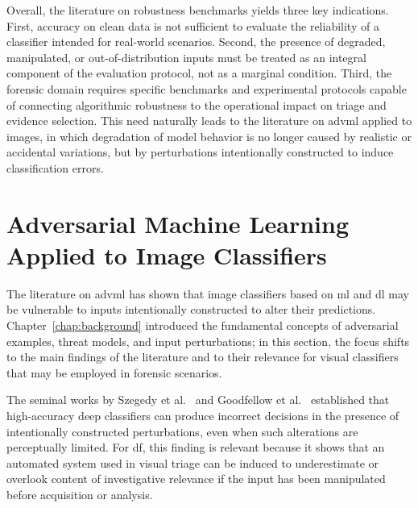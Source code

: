 Overall, the literature on robustness benchmarks yields three key indications.
First, accuracy on clean data is not sufficient to evaluate the reliability of a
classifier intended for real-world scenarios. Second, the presence of degraded,
manipulated, or out-of-distribution inputs must be treated as an integral
component of the evaluation protocol, not as a marginal condition. Third, the
forensic domain requires specific benchmarks and experimental protocols capable
of connecting algorithmic robustness to the operational impact on triage and
evidence selection. This need naturally leads to the literature on \gls{advml}
applied to images, in which degradation of model behavior is no longer caused
by realistic or accidental variations, but by perturbations intentionally
constructed to induce classification errors.


\section{Adversarial Machine Learning Applied to Image Classifiers}
\label{sec:sota-adversarial-ml}

The literature on \gls{advml} has shown that image classifiers based on
\gls{ml} and \gls{dl} may be vulnerable to inputs intentionally constructed to
alter their predictions. Chapter~\ref{chap:background} introduced the
fundamental concepts of adversarial examples, threat models, and input
perturbations; in this section, the focus shifts to the main findings of the
literature and to their relevance for visual classifiers that may be employed
in forensic scenarios.

The seminal works by Szegedy et al.~\cite{szegedy2014intriguing} and Goodfellow
et al.~\cite{goodfellow2015explaining} established that high-accuracy deep
classifiers can produce incorrect decisions in the presence of intentionally
constructed perturbations, even when such alterations are perceptually limited.
For \gls{df}, this finding is relevant because it shows that an automated
system used in visual triage can be induced to underestimate or overlook
content of investigative relevance if the input has been manipulated before
acquisition or analysis.

